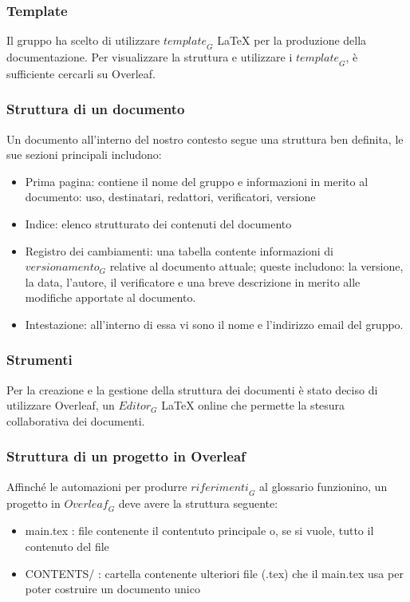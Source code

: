 \subsubsection{Template}
Il gruppo ha scelto di utilizzare $\textit{template}_G$ LaTeX per la produzione della documentazione. Per visualizzare la struttura e utilizzare i $\textit{template}_G$, è sufficiente cercarli su Overleaf.

\subsubsection{Struttura di un documento}
Un documento all'interno del nostro contesto segue una struttura ben definita, le sue sezioni principali includono:
\begin{itemize}
    \item Prima pagina: contiene il nome del gruppo e informazioni in merito al documento: uso, destinatari, redattori, verificatori, versione
    \item Indice: elenco strutturato dei contenuti del documento
    \item Registro dei cambiamenti: una tabella contente informazioni di $\textit{versionamento}_G$ relative al documento attuale; queste includono: la versione, la data, l'autore, il verificatore e una breve descrizione in merito alle modifiche apportate al documento.
    \item Intestazione: all'interno di essa vi sono il nome e l'indirizzo email del gruppo.
\end{itemize}

\subsubsection{Strumenti}
Per la creazione e la gestione della struttura dei documenti è stato deciso di utilizzare Overleaf, un $\textit{Editor}_G$ LaTeX online che permette la stesura collaborativa dei documenti.

\subsubsection{Struttura di un progetto in Overleaf}
Affinché le automazioni per produrre $\textit{riferimenti}_G$ al glossario funzionino, un progetto in $\textit{Overleaf}_G$ deve avere la struttura seguente:

\begin{itemize}
    \item main.tex : file contenente il contentuto principale o, se si vuole, tutto il contenuto del file
    \item CONTENTS/ : cartella contenente ulteriori file (.tex) che il main.tex usa per poter costruire un documento unico
\end{itemize}


